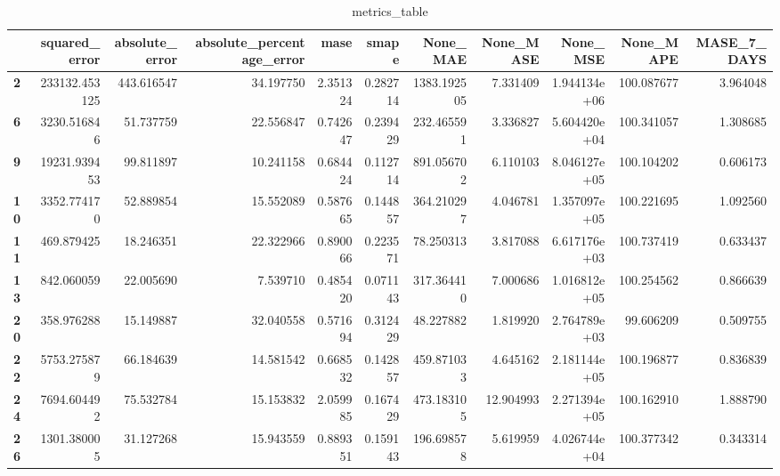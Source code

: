 \begin{table}[h]
\centering
\caption{metrics_table}
\label{table:Experiment with CNN AE and LSTM hybrid method. Global, multivariate, dataset 1. Tuned with LSTM Global Multivariate dataset 1}
\begin{tabular}{lrrrrrrrrrr}
\toprule
{} &  squared\_error &  absolute\_error &  absolute\_percentage\_error &      mase &     smape &     None\_MAE &  None\_MASE &      None\_MSE &   None\_MAPE &  MASE\_7\_DAYS \\
\midrule
\textbf{2 } &  233132.453125 &      443.616547 &                  34.197750 &  2.351324 &  0.282714 &  1383.192505 &   7.331409 &  1.944134e+06 &  100.087677 &     3.964048 \\
\textbf{6 } &    3230.516846 &       51.737759 &                  22.556847 &  0.742647 &  0.239429 &   232.465591 &   3.336827 &  5.604420e+04 &  100.341057 &     1.308685 \\
\textbf{9 } &   19231.939453 &       99.811897 &                  10.241158 &  0.684424 &  0.112714 &   891.056702 &   6.110103 &  8.046127e+05 &  100.104202 &     0.606173 \\
\textbf{10} &    3352.774170 &       52.889854 &                  15.552089 &  0.587665 &  0.144857 &   364.210297 &   4.046781 &  1.357097e+05 &  100.221695 &     1.092560 \\
\textbf{11} &     469.879425 &       18.246351 &                  22.322966 &  0.890066 &  0.223571 &    78.250313 &   3.817088 &  6.617176e+03 &  100.737419 &     0.633437 \\
\textbf{13} &     842.060059 &       22.005690 &                   7.539710 &  0.485420 &  0.071143 &   317.364410 &   7.000686 &  1.016812e+05 &  100.254562 &     0.866639 \\
\textbf{20} &     358.976288 &       15.149887 &                  32.040558 &  0.571694 &  0.312429 &    48.227882 &   1.819920 &  2.764789e+03 &   99.606209 &     0.509755 \\
\textbf{22} &    5753.275879 &       66.184639 &                  14.581542 &  0.668532 &  0.142857 &   459.871033 &   4.645162 &  2.181144e+05 &  100.196877 &     0.836839 \\
\textbf{24} &    7694.604492 &       75.532784 &                  15.153832 &  2.059985 &  0.167429 &   473.183105 &  12.904993 &  2.271394e+05 &  100.162910 &     1.888790 \\
\textbf{26} &    1301.380005 &       31.127268 &                  15.943559 &  0.889351 &  0.159143 &   196.698578 &   5.619959 &  4.026744e+04 &  100.377342 &     0.343314 \\

\end{tabular}
\end{table}
